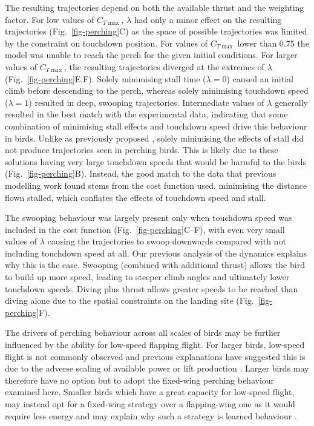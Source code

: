 The resulting trajectories depend on both the available thrust and the weighting factor. For low values of $C_{T\max}$, $\lambda$ had only a minor effect on the resulting trajectories (Fig.~\ref{fig-perching}C) as the space of possible trajectories was limited by the constraint on touchdown position. For values of $C_{T\max}$ lower than 0.75 the model was unable to reach the perch for the given initial conditions. For larger values of $C_{T\max}$, the resulting trajectories diverged at the extremes of $\lambda$ (Fig.~\ref{fig-perching}E,F). Solely minimising stall time ($\lambda=0$) caused an initial climb before descending to the perch, whereas solely minimising touchdown speed ($\lambda=1$) resulted in deep, swooping trajectories. Intermediate values of $\lambda$ generally resulted in the best match with the experimental data, indicating that some combination of minimising stall effects and touchdown speed drive this behaviour in birds. Unlike as previously proposed \cite{kleinheerenbrinkOptimizationAvianPerching2022}, solely minimising the effects of stall did not produce trajectories seen in perching birds. This is likely due to these solutions having very large touchdown speeds that would be harmful to the birds (Fig.~\ref{fig-perching}B). Instead, the good match to the data that previous modelling work found stems from the cost function used, minimising the distance flown stalled, which conflates the effects of touchdown speed and stall.

The swooping behaviour was largely present only when touchdown speed was included in the cost function (Fig.~\ref{fig-perching}C--F), with even very small values of $\lambda$ causing the trajectories to swoop downwards compared with not including touchdown speed at all. Our previous analysis of the dynamics explains why this is the case. Swooping (combined with additional thrust) allows the bird to build up more speed, leading to steeper climb angles and ultimately lower touchdown speeds. Diving plus thrust allows greater speeds to be reached than diving alone due to the spatial constraints on the landing site (Fig.~\ref{fig-perching}F).

The drivers of perching behaviour across all scales of birds may be further influenced by the ability for low-speed flapping flight. For larger birds, low-speed flight is not commonly observed and previous explanations have suggested this is due to the adverse scaling of available power \cite{pennycuickPowerRequirementsHorizontal1968} or lift production \cite{ellingtonLimitationsAnimalFlight1991}. Larger birds may therefore have no option but to adopt the fixed-wing perching behaviour examined here. Smaller birds which have a great capacity for low-speed flight, may instead opt for a fixed-wing strategy over a flapping-wing one as it would require less energy and may explain why such a strategy is learned behaviour \cite{kleinheerenbrinkOptimizationAvianPerching2022}.


